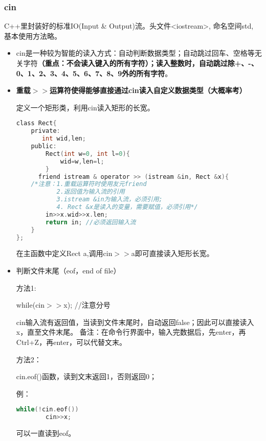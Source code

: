 \documentclass[UTF8]{ctexart}
\begin{document}
\subsubsection{cin}
C++里封装好的标准IO(Input \& Output)流。头文件<iostream>, 命名空间std, 基本使用方法略。
\begin{itemize}
  \item cin是一种较为智能的读入方式：自动判断数据类型；自动跳过回车、空格等无关字符\textbf{（重点：不会读入键入的所有字符）；读入整数时，自动跳过除+、-、0、1、2、3、4、5、6、7、8、9外的所有字符}。
  \item \textbf{重载$>>$运算符使得能够直接通过cin读入自定义数据类型（大概率考）}

  定义一个矩形类，利用cin读入矩形的长宽。
    \begin{lstlisting}[language = C,basicstyle=\small\ttfamily]
class Rect{
    private:
	   int wid,len;
	public:
		Rect(int w=0, int l=0){
			wid=w,len=l;
		}	
	  friend istream & operator >> (istream &in, Rect &x){
	/*注意：1.重载运算符时使用友元friend 
           2.返回值为输入流的引用
           3.istream &in为输入流，必须引用; 
           4. Rect &x是读入的变量，需要赋值，必须引用*/
		in>>x.wid>>x.len;
		return in; //必须返回输入流
	}
};
    \end{lstlisting}
    在主函数中定义Rect a,调用cin$>>$a即可直接读入矩形长宽。
  \item 判断文件末尾（eof，end of file）
  
方法1:
	
    while(cin$>>$x); //注意分号
    
	cin输入流有返回值，当读到文件末尾时，自动返回false；因此可以直接读入x，直至文件末尾。
	备注：在命令行界面中，输入完数据后，先enter，再Ctrl+Z，再enter，可以代替文末。

方法2：
	
    cin.eof()函数，读到文末返回1，否则返回0；
    
	例：
    \begin{lstlisting}[language = C,basicstyle=\small\ttfamily]
	while(!cin.eof())
		cin>>x;
    \end{lstlisting}
    可以一直读到eof。
\end{itemize}
\end{document}
